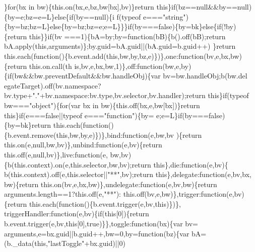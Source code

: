 \begin{DoxyCode}
      \}for(bx in bw)\{this.on(bx,e,bz,bw[bx],bv)\}return this\}if(bz==null&&by==null)\{by=e;bz=e=L\}else\{if(by==null)\{i
      f(typeof e===\textcolor{stringliteral}{"string"})\{by=bz;bz=L\}else\{by=bz;bz=e;e=L\}\}\}if(by===false)\{by=bk\}else\{if(!by)\{return this\}\}if(bv
      ===1)\{bA=by;by=function(bB)\{b().off(bB);return bA.apply(this,arguments)\};by.guid=bA.guid||(bA.guid=b.guid++)
      \}return this.each(function()\{b.event.add(this,bw,by,bz,e)\})\},one:\textcolor{keyword}{function}(bv,e,bx,bw)\{return this.on.call(th
      is,bv,e,bx,bw,1)\},off:\textcolor{keyword}{function}(bw,e,by)\{if(bw&&bw.preventDefault&&bw.handleObj)\{var bv=bw.handleObj;b(bw.del
      egateTarget).off(bv.namespace?bv.type+\textcolor{stringliteral}{"."}+bv.namespace:bv.type,bv.selector,bv.handler);return this\}\textcolor{keywordflow}{if}(typeof
       bw===\textcolor{stringliteral}{"object"})\{for(var bx in bw)\{this.off(bx,e,bw[bx])\}\textcolor{keywordflow}{return} \textcolor{keyword}{this}\}\textcolor{keywordflow}{if}(e===\textcolor{keyword}{false}||typeof e===\textcolor{stringliteral}{"function"})\{by=
      e;e=L\}\textcolor{keywordflow}{if}(by===\textcolor{keyword}{false})\{by=bk\}\textcolor{keywordflow}{return} this.each(\textcolor{keyword}{function}()\{b.event.remove(\textcolor{keyword}{this},bw,by,e)\})\},bind:\textcolor{keyword}{function}(e,bw,bv
      )\{\textcolor{keywordflow}{return} this.on(e,null,bw,bv)\},unbind:\textcolor{keyword}{function}(e,bv)\{\textcolor{keywordflow}{return} this.off(e,null,bv)\},live:\textcolor{keyword}{function}(e,
      bw,bv)\{b(this.context).on(e,this.selector,bw,bv);\textcolor{keywordflow}{return} \textcolor{keyword}{this}\},die:\textcolor{keyword}{function}(e,bv)\{
      b(this.context).off(e,this.selector||\textcolor{stringliteral}{"**"},bv);\textcolor{keywordflow}{return} \textcolor{keyword}{this}\},delegate:\textcolor{keyword}{function}(e,bv,bx,
      bw)\{\textcolor{keywordflow}{return} this.on(bv,e,bx,bw)\},undelegate:\textcolor{keyword}{function}(e,bv,bw)\{\textcolor{keywordflow}{return} arguments.length==1?this.off(e,\textcolor{stringliteral}{"**"}):
      this.off(bv,e,bw)\},trigger:function(e,bv)\{\textcolor{keywordflow}{return} this.each(\textcolor{keyword}{function}()\{b.event.trigger(e,bv,\textcolor{keyword}{this})\})\},
      triggerHandler:\textcolor{keyword}{function}(e,bv)\{\textcolor{keywordflow}{if}(\textcolor{keyword}{this}[0])\{\textcolor{keywordflow}{return} b.event.trigger(e,bv,\textcolor{keyword}{this}[0],\textcolor{keyword}{true})\}\},toggle:\textcolor{keyword}{function}(bx)\{var bv=
      arguments,e=bx.guid||b.guid++,bw=0,by=\textcolor{keyword}{function}(bz)\{var bA=(b.\_data(\textcolor{keyword}{this},\textcolor{stringliteral}{"lastToggle"}+bx.guid)||0)%

\end{DoxyCode}
